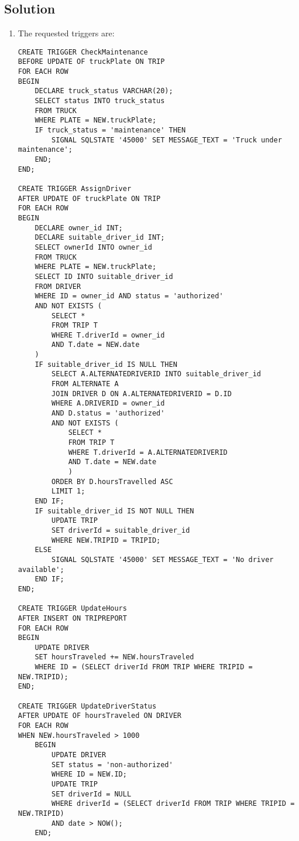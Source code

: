 \subsection*{Solution}
\begin{enumerate}
    \item The requested triggers are: 
        \begin{lstlisting}[style=SQL]
CREATE TRIGGER CheckMaintenance
BEFORE UPDATE OF truckPlate ON TRIP
FOR EACH ROW
BEGIN
    DECLARE truck_status VARCHAR(20);
    SELECT status INTO truck_status
    FROM TRUCK
    WHERE PLATE = NEW.truckPlate;
    IF truck_status = 'maintenance' THEN
        SIGNAL SQLSTATE '45000' SET MESSAGE_TEXT = 'Truck under maintenance';
    END;
END;

CREATE TRIGGER AssignDriver
AFTER UPDATE OF truckPlate ON TRIP
FOR EACH ROW
BEGIN
    DECLARE owner_id INT;
    DECLARE suitable_driver_id INT;
    SELECT ownerId INTO owner_id
    FROM TRUCK
    WHERE PLATE = NEW.truckPlate;
    SELECT ID INTO suitable_driver_id
    FROM DRIVER
    WHERE ID = owner_id AND status = 'authorized'
    AND NOT EXISTS (
        SELECT *
        FROM TRIP T
        WHERE T.driverId = owner_id
        AND T.date = NEW.date
    )
    IF suitable_driver_id IS NULL THEN
        SELECT A.ALTERNATEDRIVERID INTO suitable_driver_id
        FROM ALTERNATE A
        JOIN DRIVER D ON A.ALTERNATEDRIVERID = D.ID
        WHERE A.DRIVERID = owner_id
        AND D.status = 'authorized'
        AND NOT EXISTS (
            SELECT *
            FROM TRIP T
            WHERE T.driverId = A.ALTERNATEDRIVERID
            AND T.date = NEW.date
            )
        ORDER BY D.hoursTravelled ASC
        LIMIT 1;
    END IF;
    IF suitable_driver_id IS NOT NULL THEN
        UPDATE TRIP
        SET driverId = suitable_driver_id
        WHERE NEW.TRIPID = TRIPID;
    ELSE
        SIGNAL SQLSTATE '45000' SET MESSAGE_TEXT = 'No driver available';
    END IF;
END;

CREATE TRIGGER UpdateHours
AFTER INSERT ON TRIPREPORT
FOR EACH ROW
BEGIN
    UPDATE DRIVER
    SET hoursTraveled += NEW.hoursTraveled
    WHERE ID = (SELECT driverId FROM TRIP WHERE TRIPID = NEW.TRIPID);
END;

CREATE TRIGGER UpdateDriverStatus
AFTER UPDATE OF hoursTraveled ON DRIVER
FOR EACH ROW
WHEN NEW.hoursTraveled > 1000
    BEGIN
        UPDATE DRIVER
        SET status = 'non-authorized'
        WHERE ID = NEW.ID;
        UPDATE TRIP
        SET driverId = NULL
        WHERE driverId = (SELECT driverId FROM TRIP WHERE TRIPID = NEW.TRIPID)
        AND date > NOW();
    END;
        \end{lstlisting}
\end{enumerate}